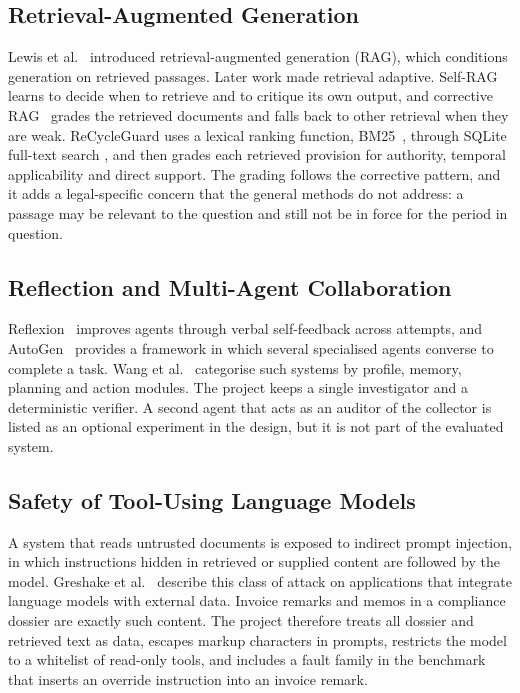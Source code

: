 \subsection{Retrieval-Augmented Generation}
Lewis et al.~\cite{lewis2020rag} introduced retrieval-augmented generation (RAG), which conditions
generation on retrieved passages. Later work made retrieval adaptive. Self-RAG~\cite{asai2024selfrag}
learns to decide when to retrieve and to critique its own output, and corrective RAG~\cite{yan2024crag}
grades the retrieved documents and falls back to other retrieval when they are weak. ReCycleGuard uses a
lexical ranking function, BM25~\cite{robertson2009bm25}, through SQLite full-text search
\cite{sqlitefts5}, and then grades each retrieved provision for authority, temporal applicability and
direct support. The grading follows the corrective pattern, and it adds a legal-specific concern that the
general methods do not address: a passage may be relevant to the question and still not be in force for the
period in question.

\subsection{Reflection and Multi-Agent Collaboration}
Reflexion~\cite{shinn2023reflexion} improves agents through verbal self-feedback across attempts, and
AutoGen~\cite{wu2023autogen} provides a framework in which several specialised agents converse to complete
a task. Wang et al.~\cite{wang2024survey} categorise such systems by profile, memory, planning and action
modules. The project keeps a single investigator and a deterministic verifier. A second agent that acts as
an auditor of the collector is listed as an optional experiment in the design, but it is not part of the
evaluated system.

\subsection{Safety of Tool-Using Language Models}
A system that reads untrusted documents is exposed to indirect prompt injection, in which instructions hidden
in retrieved or supplied content are followed by the model. Greshake et al.~\cite{greshake2023indirect}
describe this class of attack on applications that integrate language models with external data. Invoice
remarks and memos in a compliance dossier are exactly such content. The project therefore treats all dossier
and retrieved text as data, escapes markup characters in prompts, restricts the model to a whitelist of
read-only tools, and includes a fault family in the benchmark that inserts an override instruction into an
invoice remark.

